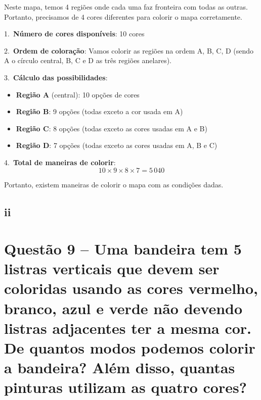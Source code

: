\documentclass[12pt,a4paper]{article}
\begin{document}
    \vspace{0.5cm}

    Neste mapa, temos 4 regiões onde cada uma faz fronteira com todas as outras. Portanto, precisamos de 4 cores diferentes para colorir o mapa corretamente.

    1.~\textbf{Número de cores disponíveis}: 10 cores

    2.~\textbf{Ordem de coloração}: Vamos colorir as regiões na ordem A, B, C, D (sendo A o círculo central, B, C e D as três regiões anelares).

    3.~\textbf{Cálculo das possibilidades}:
    \begin{itemize}
        \item \textbf{Região A} (central): 10 opções de cores
        \item \textbf{Região B}: 9 opções (todas exceto a cor usada em A)
        \item \textbf{Região C}: 8 opções (todas exceto as cores usadas em A e B)
        \item \textbf{Região D}: 7 opções (todas exceto as cores usadas em A, B e C)
    \end{itemize}

    4.~\textbf{Total de maneiras de colorir}:
    \[
    10 \times 9 \times 8 \times 7 = 5\,040
    \]

    Portanto, existem  maneiras de colorir o mapa com as condições dadas.

    \subsection*{ii}


\section*{Questão 9 -- Uma bandeira tem 5 listras verticais que devem ser coloridas usando as
cores vermelho, branco, azul e verde não devendo listras adjacentes ter a
mesma cor. De quantos modos podemos colorir a bandeira? Além disso,
quantas pinturas utilizam as quatro cores?}
    
\end{document}
